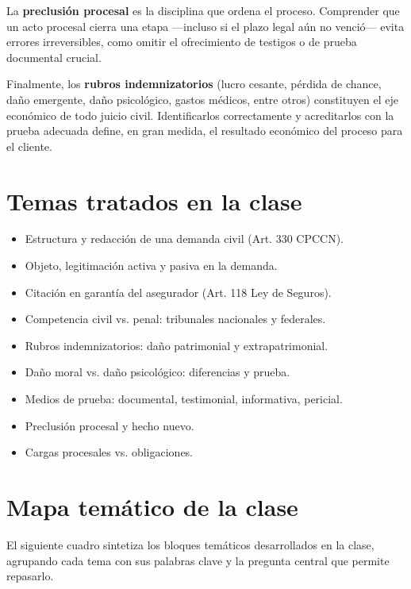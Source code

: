 \documentclass[12pt,oneside]{book}
\begin{document}
La \textbf{preclusión procesal} es la disciplina que ordena el proceso. Comprender que un acto procesal cierra una etapa —incluso si el plazo legal aún no venció— evita errores irreversibles, como omitir el ofrecimiento de testigos o de prueba documental crucial.

Finalmente, los \textbf{rubros indemnizatorios} (lucro cesante, pérdida de chance, daño emergente, daño psicológico, gastos médicos, entre otros) constituyen el eje económico de todo juicio civil. Identificarlos correctamente y acreditarlos con la prueba adecuada define, en gran medida, el resultado económico del proceso para el cliente.

\section{Temas tratados en la clase}

\begin{itemize}
    \item Estructura y redacción de una demanda civil (Art. 330 CPCCN).
    \item Objeto, legitimación activa y pasiva en la demanda.
    \item Citación en garantía del asegurador (Art. 118 Ley de Seguros).
    \item Competencia civil vs. penal: tribunales nacionales y federales.
    \item Rubros indemnizatorios: daño patrimonial y extrapatrimonial.
    \item Daño moral vs. daño psicológico: diferencias y prueba.
    \item Medios de prueba: documental, testimonial, informativa, pericial.
    \item Preclusión procesal y hecho nuevo.
    \item Cargas procesales vs. obligaciones.
\end{itemize}

\section{Mapa temático de la clase}

El siguiente cuadro sintetiza los bloques temáticos desarrollados en la clase, agrupando cada tema con sus palabras clave y la pregunta central que permite repasarlo.
\end{document}
